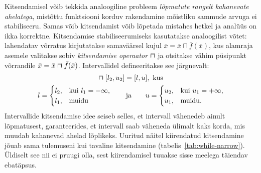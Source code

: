 \documentclass[../thesis.tex]{subfiles}
\begin{document}
Kitsendamisel võib tekkida analoogiline probleem \emph{lõpmatute rangelt kahanevate ahelatega}, mistõttu funktsiooni korduv rakendamine mõistliku sammude arvuga ei stabiliseeru. Samas võib kitsendamist võib lõpetada mistahes hetkel ja analüüs on ikka korrektne. Kitsendamise stabiliseerumiseks kasutatakse analoogilist võtet: lahendatav võrratus kirjutatakse samaväärsel kujul $\bar{x} = \bar{x} \sqcap \bar{f}(\bar{x})$, kus alamraja asemele valitakse sobiv \emph{kitsendamise operaator} $\narrow$ ja otsitakse vähim püsipunkt võrrandile $\bar{x} = \bar{x} \narrow \bar{f}(\bar{x})$. Intervallidel defineeritakse see järgnevalt:
\begin{gather*}
	[l_1, u_1] \narrow [l_2, u_2] = [l, u], \text{ kus} \\
	l = \begin{cases}
		l_2, & \text{kui } l_1 = -\infty, \\
		l_1, & \text{muidu}
	\end{cases}
	\qquad \text{ja} \qquad
	u = \begin{cases}
		u_2, & \text{kui } u_1 = +\infty, \\
		u_1, & \text{muidu}.
	\end{cases}
\end{gather*}
Intervallide kitsendamise idee seiseb selles, et intervall vähenedeb ainult lõpmatusest, garanteerides, et intervall saab väheneda ülimalt kaks korda, mis muudab kahanevad ahelad lõplikeks. Uuritud näitel kiirendatud kitsendamine jõuab sama tulemuseni kui tavaline kitsendamine (tabelis~\ref{tab:while-narrow}). Üldiselt see nii ei pruugi olla, sest kiirendamisel tuuakse sisse meelega täiendav ebatäpsus.
\end{document}
